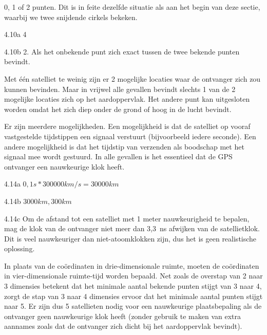 \begin{Antwoord}{4.9}
		0, 1 of 2 punten. Dit is in feite dezelfde situatie als aan het begin van deze sectie, waarbij we twee snijdende cirkels bekeken.
	
\end{Antwoord}
\begin{Antwoord}{4.10a}
			4
		
\end{Antwoord}
\begin{Antwoord}{4.10b}
			2. Als het onbekende punt zich exact tussen de twee bekende punten bevindt.
		
\end{Antwoord}
\begin{Antwoord}{4.11}
		Met \'e\'en satelliet te weinig zijn er 2 mogelijke locaties waar de ontvanger zich zou kunnen bevinden. Maar in vrijwel alle gevallen bevindt slechts 1 van de 2 mogelijke locaties zich op het aardoppervlak. Het andere punt kan uitgesloten worden omdat het zich diep onder de grond of hoog in de lucht bevindt.
	
\end{Antwoord}
\begin{Antwoord}{4.13}
		Er zijn meerdere mogelijkheden. Een mogelijkheid is dat de satelliet op vooraf vastgestelde tijdstippen een signaal verstuurt (bijvoorbeeld iedere seconde). Een andere mogelijkheid is dat het tijdstip van verzenden als boodschap met het signaal mee wordt gestuurd. In alle gevallen is het essentieel dat de GPS ontvanger een nauwkeurige klok heeft.
	
\end{Antwoord}
\begin{Antwoord}{4.14a}
			$0,1 s * 300000 km/s = 30000 km$
		
\end{Antwoord}
\begin{Antwoord}{4.14b}
			$3000 km, 300 km$
		
\end{Antwoord}
\begin{Antwoord}{4.14c}
			Om de afstand tot een satelliet met 1 meter nauwkeurigheid te bepalen, mag de klok van de ontvanger niet meer dan 3,3~ns afwijken van de satellietklok. Dit is veel nauwkeuriger dan niet-atoomklokken zijn, dus het is geen realistische oplossing.
		
\end{Antwoord}
\begin{Antwoord}{4.15}
		In plaats van de co\"ordinaten in drie-dimensionale ruimte, moeten de co\"ordinaten in vier-dimensionale ruimte-tijd worden bepaald. Net zoals de overstap van 2 naar 3 dimensies betekent dat het minimale aantal bekende punten stijgt van 3 naar 4, zorgt de stap van 3 naar 4 dimensies ervoor dat het minimale aantal punten stijgt naar 5. Er zijn dus 5 satellieten nodig voor een nauwkeurige plaatsbepaling als de ontvanger geen nauwkeurige klok heeft (zonder gebruik te maken van extra aannames zoals dat de ontvanger zich dicht bij het aardoppervlak bevindt).
	
\end{Antwoord}
